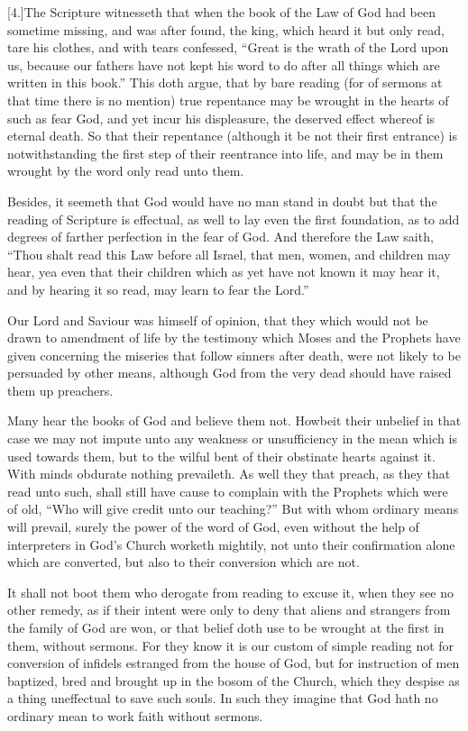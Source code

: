[4.]The Scripture witnesseth that when the book of the  Law of God had been sometime missing, and was after found, the king, which heard it but only read, tare his clothes,
 and with tears confessed, “Great is the wrath of the Lord upon us, because our fathers have not kept his word to do after all things which are written in this book.” This doth argue, that by bare reading (for of sermons at that time there is no mention) true repentance may be wrought in the hearts of such as fear God, and yet incur his displeasure, the deserved effect whereof is eternal death. So that their repentance (although it be not their first entrance) is notwithstanding the first step of their reentrance into life, and may be in them wrought by the word only read unto them.

Besides, it seemeth that God would have no man stand in doubt but that the reading of Scripture is effectual, as well to lay even the first foundation, as to add degrees of farther perfection in the fear of God. And therefore the Law saith, “Thou shalt read this Law before all Israel, that men, women, and children may hear, yea even that their children which as yet have not known it may hear it, and by hearing it so read, may learn to fear the Lord.”

Our Lord and Saviour was himself of opinion, that they which would not be drawn to amendment of life by the testimony which Moses and the Prophets have given concerning the miseries that follow sinners after death, were not likely to be persuaded by other means, although God from the very dead should have raised them up preachers.

Many hear the books of God and believe them not. Howbeit their unbelief in that case we may not impute unto any weakness or unsufficiency in the mean which is used towards them, but to the wilful bent of their obstinate hearts against it. With minds obdurate nothing prevaileth. As well they that preach, as they that read unto such, shall still have cause to complain with the Prophets which were of old, “Who will give credit unto our teaching?” But with whom ordinary means will prevail, surely the power of the word of God, even without the help of interpreters in God’s Church worketh mightily, not unto their confirmation alone which are converted, but also to their conversion which are not.




It shall not boot them who derogate from reading to excuse it, when they see no other remedy, as if their intent were only to deny that aliens and strangers from the family of God are won, or that belief doth use to be wrought at the first in them, without sermons. For they know it is our custom of simple reading not for conversion of infidels estranged from the house of God, but for instruction of men baptized, bred and brought up in the bosom of the Church, which they despise as a thing uneffectual to save such souls. In such they imagine that God hath no ordinary mean to work faith without sermons.

